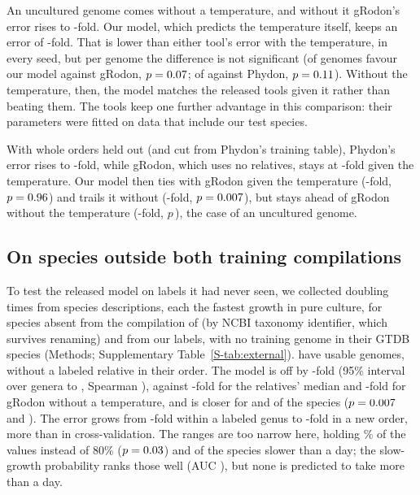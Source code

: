 An uncultured genome comes without a temperature, and without it gRodon's error rises to \RelGRodonNoTempErr-fold. Our model,
which predicts the temperature itself, keeps an error of \RelOursErr-fold. That is lower than either tool's error with the
temperature, in every seed, but per genome the difference is not significant (\PairGRodonBetter of \PairGRodonN genomes
favour our model against gRodon, $p=0.07$; \PairPhydonBetter of \PairPhydonN against Phydon, $p=0.11$).
Without the temperature, then, the model matches the released tools given it rather than beating them. The tools keep one
further advantage in this comparison: their parameters were fitted on data that include our test species.

With whole orders held out (and cut from Phydon's training table), Phydon's error rises to \RelOrdPhydonErr-fold, while
gRodon, which uses no relatives, stays at \RelOrdGRodonErr-fold given the temperature. Our model then ties with gRodon given
the temperature (\RelOrdOursTempErr-fold, $p=0.96$) and trails it without (\RelOrdOursErr-fold,
$p=0.007$), but stays ahead of gRodon without the temperature (\RelOrdGRodonNoTempErr-fold,
$p$\,\PairOrdGRodonNoTempP), the case of an uncultured genome.

\subsection{On species outside both training compilations}
To test the released model on labels it had never seen, we collected \ExtNCurated doubling times from species descriptions,
each the fastest growth in pure culture, for species absent from the compilation of \citet{madin2020} (by NCBI taxonomy
identifier, which survives renaming) and from our labels, with no training genome in their GTDB species (Methods;
Supplementary Table~\ref{S-tab:external}). \ExtN have usable genomes, \ExtNNewOrder without a labeled relative in their
order. The model is off by \ExtModelErr-fold (95\% interval over genera \ExtModelLo to \ExtModelHi, Spearman \ExtModelRho),
against \ExtBaseErr-fold for the relatives' median and \ExtGRodonErr-fold for gRodon without a temperature, and is closer for
\ExtBetterBase and \ExtBetterGRodon of the \ExtN species ($p=0.007$ and \ExtPGRodon). The error grows from
\ExtModelErrSameGenus-fold within a labeled genus to \ExtModelErrNewOrder-fold in a new order, more than in
cross-validation. The ranges are too narrow here, holding \ExtCoverage\% of the values instead of 80\% ($p=0.03$)
and \ExtCoverageSlowIn of the \ExtNSlow species slower than a day; the slow-growth probability ranks those \ExtNSlow well
(AUC \ExtSlowAuc), but none is predicted to take more than a day.

